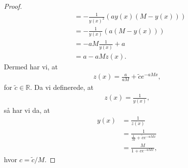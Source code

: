 \begin{proof}
\begin{align*}
		&= -\frac{1}{y(x)^2}(ay(x)(M-y(x)))\\
		&= -\frac{1}{y(x)}(a(M-y(x)))\\
		&= -aM \frac{1}{y(x)} + a\\
		&= a-aMz(x).
	\end{align*}
	Dermed har vi, at 
	\begin{align*}
		z(x) = \frac{a}{aM} + \tilde{c}e^{-aMx},
	\end{align*}
	for $\tilde{c} \in \mathbb{R}$. Da vi definerede, at 
	\begin{align*}
		z(x) = \frac{1}{y(x)}, 
	\end{align*}
	så har vi da, at
	\begin{align*}
		y(x) &= \frac{1}{z(x)}\\
		&= \frac{1}{\frac{1}{M}+\tilde{c}e^{-aMx}}\\
		&= \frac{M}{1+ce^{-aMx}},
	\end{align*}
	hvor $c = \tilde{c}/M$.
\end{proof}
